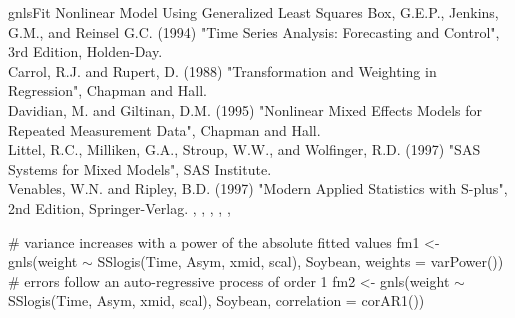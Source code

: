 \documentclass[pdftex]{article} \usepackage{url,graphicx}
\renewcommand{\Twiddle}{\mbox{\(\sim\)}}
\begin{document}
\begin{Helpfile}{gnls}{Fit Nonlinear Model Using Generalized Least Squares}
Box, G.E.P., Jenkins, G.M., and Reinsel G.C. (1994) "Time Series
Analysis: Forecasting and Control", 3rd Edition, Holden-Day. \\
Carrol, R.J. and Rupert, D. (1988) "Transformation and Weighting in
Regression", Chapman and Hall.\\
Davidian, M. and Giltinan, D.M. (1995) "Nonlinear Mixed Effects Models
for Repeated Measurement Data", Chapman and Hall.\\
Littel, R.C., Milliken, G.A., Stroup, W.W., and Wolfinger, R.D. (1997)
"SAS Systems for Mixed Models", SAS Institute.\\
Venables, W.N. and Ripley, B.D. (1997) "Modern Applied Statistics with
S-plus", 2nd Edition, Springer-Verlag.
, ,
, ,
, 
\need 15pt
\vspace{-16pt}
\begin{Example}
# variance increases with a power of the absolute fitted values
fm1 <- gnls(weight {\Twiddle} SSlogis(Time, Asym, xmid, scal), Soybean,
            weights = varPower())
# errors follow an auto-regressive process of order 1 
fm2 <- gnls(weight {\Twiddle} SSlogis(Time, Asym, xmid, scal), Soybean,
            correlation = corAR1())
\end{Example}
\end{Helpfile}
\end{document}
